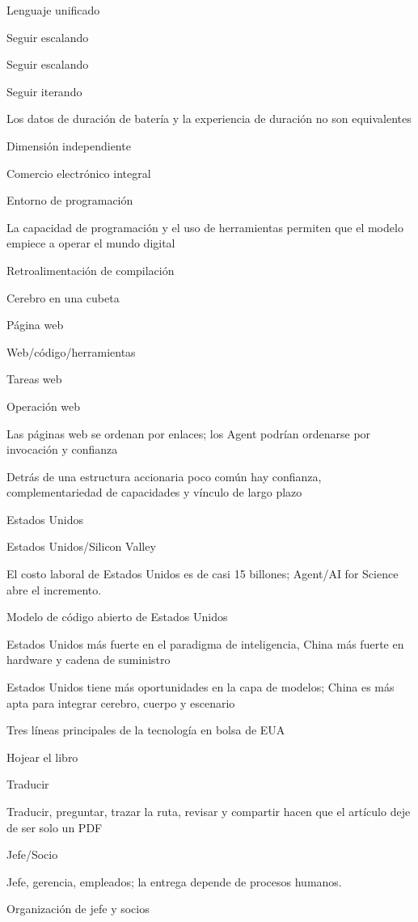 \documentclass{article}
\begin{document}
Lenguaje unificado

Seguir escalando

Seguir escalando

Seguir iterando

Los datos de duración de batería y la experiencia de duración no son equivalentes

Dimensión independiente

Comercio electrónico integral

Entorno de programación

La capacidad de programación y el uso de herramientas permiten que el modelo empiece a operar el mundo digital

Retroalimentación de compilación

Cerebro en una cubeta

Página web

Web/código/herramientas

Tareas web

Operación web

Las páginas web se ordenan por enlaces; los Agent podrían ordenarse por invocación y confianza

Detrás de una estructura accionaria poco común hay confianza, complementariedad de capacidades y vínculo de largo plazo

Estados Unidos

Estados Unidos/Silicon Valley

El costo laboral de Estados Unidos es de casi 15 billones; Agent/AI for Science abre el incremento.

Modelo de código abierto de Estados Unidos

Estados Unidos más fuerte en el paradigma de inteligencia, China más fuerte en hardware y cadena de suministro

Estados Unidos tiene más oportunidades en la capa de modelos; China es más apta para integrar cerebro, cuerpo y escenario

Tres líneas principales de la tecnología en bolsa de EUA

Hojear el libro

Traducir

Traducir, preguntar, trazar la ruta, revisar y compartir hacen que el artículo deje de ser solo un PDF

Jefe/Socio

Jefe, gerencia, empleados; la entrega depende de procesos humanos.

Organización de jefe y socios
\end{document}
